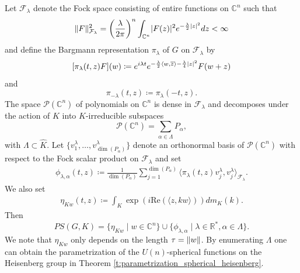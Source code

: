 \documentclass[12pt,reqno,a4paper]{amsart}
\theoremstyle{theorem}
\theoremstyle{definition}
\numberwithin{theorem}{section}
\numberwithin{equation}{section}
\newcommand{\R}{\mathbb{R}}
\newcommand{\C}{\mathbb{C}}
\DeclarePairedDelimiter{\norm}{\lVert}{\rVert}
\DeclarePairedDelimiter{\abs}{\lvert}{\rvert}
\begin{document}
	Let $\mathcal{F}_\lambda$ denote the Fock space consisting of entire functions on $\C^n$ such that
	\[
	\norm{F}^2_{\mathcal{F_\lambda}} = \left(\frac{\lambda}{2\pi}\right)^n\int_{\C^n}\abs{F(z)}^2e^{-\frac{\lambda}{2}\abs{z}^2}dz<\infty
	\]
	and define the Bargmann representation $\pi_\lambda$ of $G$ on $\mathcal{F}_\lambda$ by
	\[
	[\pi_\lambda(t,z)F](w)\coloneqq e^{i\lambda t}e^{-\frac{\lambda}{2}\langle w, \overline{z}\rangle-\frac{\lambda}{4}\abs{z}^2}F(w+z)
	\]
	and 
	\[
	\pi_{-\lambda}(t, z) \coloneqq \pi_\lambda(-t, z).
	\]
	The space $\mathcal{P}(\C^n)$ of polynomials on $\C^n$ is dense in $\mathcal{F}_\lambda$ and decomposes under the action of $K$ into $K$-irreducible subspaces 
	\[
	\mathcal{P}(\C^n) = \sum_{\alpha\in \Lambda}P_\alpha,
	\]
	with $\Lambda\subset \widehat{K}$.
	Let $\{v_1^\lambda,\dots, v_{\dim(P_\alpha)}^\lambda\}$ denote an orthonormal basis of $\mathcal{P}(\C^n)$ with respect to the Fock scalar product on $\mathcal{F}_\lambda$ and set
	\begin{align*}
	\phi_{\lambda,\alpha}(t, z)\coloneqq \frac{1}{\dim(P_\alpha)}\sum_{j=1}^{\dim(P_\alpha)}\langle \pi_\lambda(t,z)v_j^\lambda, v_j^\lambda\rangle_{\mathcal{F}_\lambda}.
	\end{align*}
	We also set
	\begin{align*}
		\eta_{Kw}(t, z)\coloneqq \int_K \exp(i\mathrm{Re}(\langle z, kw\rangle ))dm_K(k).
	\end{align*}
	Then 
	\[
	PS(G, K) = \{\eta_{Kw}\mid w\in \C^n\}\cup \{\phi_{\lambda,\alpha}\mid \lambda\in \R^*, \alpha\in \Lambda\}.
	\]
	We note that $\eta_{Kw}$ only depends on the length $\tau=\norm{w}$. By enumerating $\Lambda$ one can obtain the parametrization of the $U(n)$-spherical functions on the Heisenberg group in Theorem \ref{t:parametrization_spherical_heisenberg}.
\end{document}
